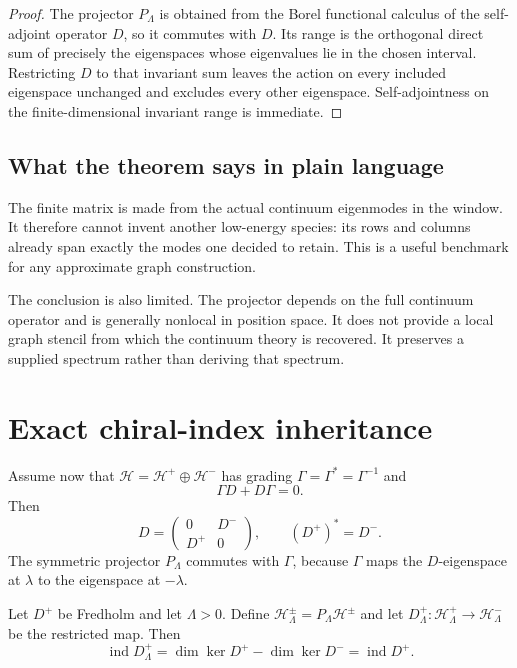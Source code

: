 \documentclass[11pt]{article}
\newcommand{\Hcal}{\mathcal H}
\newcommand{\ind}{\operatorname{ind}}
\begin{document}
\begin{proof}
The projector \(P_\Lambda\) is obtained from the Borel functional calculus of
the self-adjoint operator \(D\), so it commutes with \(D\). Its range is the
orthogonal direct sum of precisely the eigenspaces whose eigenvalues lie in
the chosen interval. Restricting \(D\) to that invariant sum leaves the action
on every included eigenspace unchanged and excludes every other eigenspace.
Self-adjointness on the finite-dimensional invariant range is immediate.
\end{proof}

\subsection{What the theorem says in plain language}

The finite matrix is made from the actual continuum eigenmodes in the window.
It therefore cannot invent another low-energy species: its rows and columns
already span exactly the modes one decided to retain. This is a useful
benchmark for any approximate graph construction.

The conclusion is also limited. The projector depends on the full continuum
operator and is generally nonlocal in position space. It does not provide a
local graph stencil from which the continuum theory is recovered. It
preserves a supplied spectrum rather than deriving that spectrum.

\section{Exact chiral-index inheritance}

Assume now that \(\Hcal=\Hcal^+\oplus\Hcal^-\) has grading
\(\Gamma=\Gamma^*=\Gamma^{-1}\) and
\[
 \Gamma D+D\Gamma=0.
\]
Then
\[
 D=
 \begin{pmatrix}
 0&D^-\\
 D^+&0
 \end{pmatrix},
\qquad
(D^+)^*=D^-.
\]
The symmetric projector \(P_\Lambda\) commutes with \(\Gamma\), because
\(\Gamma\) maps the \(D\)-eigenspace at \(\lambda\) to the eigenspace at
\(-\lambda\).

\begin{theorem}
\label{thm:index}
Let \(D^+\) be Fredholm and let \(\Lambda>0\). Define
\(\Hcal^\pm_\Lambda=P_\Lambda\Hcal^\pm\) and let
\(D^+_\Lambda:\Hcal^+_\Lambda\to\Hcal^-_\Lambda\) be the restricted map.
Then
\[
 \ind D^+_\Lambda
 =
 \dim\ker D^+-\dim\ker D^-
 =
 \ind D^+.
\]
\end{theorem}
\end{document}
